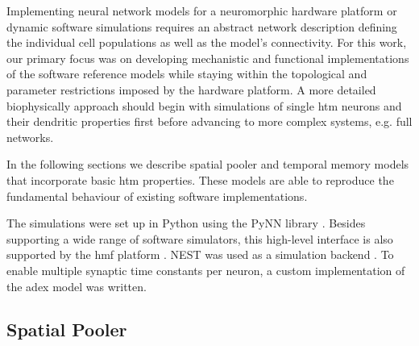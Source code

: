 Implementing neural network models for a neuromorphic hardware platform or
dynamic software simulations requires an abstract network description defining
the individual cell populations as well as the model's connectivity. For this
work, our primary focus was on developing mechanistic and functional
implementations of the software reference models while staying within the
topological and parameter restrictions imposed by the hardware platform.
A more detailed biophysically approach should begin with simulations of single
\gls{htm} neurons and their dendritic properties first before advancing to more
complex systems, e.g. full networks.

In the following sections we describe spatial pooler and temporal memory
models that incorporate basic \gls{htm} properties. These models are able to
reproduce the fundamental behaviour of existing software implementations.

The simulations were set up in Python using the PyNN library \citep{davison2008pynn}. Besides supporting a wide range of software simulators, this high-level interface is also supported by the \gls{hmf} platform \citep{billaudelle14pyhmf}. NEST was used as a simulation backend \citep{gewaltig2007nest}. To enable multiple synaptic time constants per neuron, a custom implementation of the \gls{adex} model was written.

\subsection{Spatial Pooler}
\label{sss:spatial_pooler_network}

